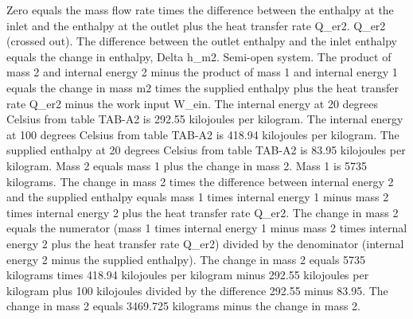 Zero equals the mass flow rate times the difference between the enthalpy at the inlet and the enthalpy at the outlet plus the heat transfer rate Q_er2.
Q_er2 (crossed out).
The difference between the outlet enthalpy and the inlet enthalpy equals the change in enthalpy, Delta h_m2.
Semi-open system.
The product of mass 2 and internal energy 2 minus the product of mass 1 and internal energy 1 equals the change in mass m2 times the supplied enthalpy plus the heat transfer rate Q_er2 minus the work input W_ein.
The internal energy at 20 degrees Celsius from table TAB-A2 is 292.55 kilojoules per kilogram.
The internal energy at 100 degrees Celsius from table TAB-A2 is 418.94 kilojoules per kilogram.
The supplied enthalpy at 20 degrees Celsius from table TAB-A2 is 83.95 kilojoules per kilogram.
Mass 2 equals mass 1 plus the change in mass 2.
Mass 1 is 5735 kilograms.
The change in mass 2 times the difference between internal energy 2 and the supplied enthalpy equals mass 1 times internal energy 1 minus mass 2 times internal energy 2 plus the heat transfer rate Q_er2.
The change in mass 2 equals the numerator (mass 1 times internal energy 1 minus mass 2 times internal energy 2 plus the heat transfer rate Q_er2) divided by the denominator (internal energy 2 minus the supplied enthalpy).
The change in mass 2 equals 5735 kilograms times 418.94 kilojoules per kilogram minus 292.55 kilojoules per kilogram plus 100 kilojoules divided by the difference 292.55 minus 83.95.
The change in mass 2 equals 3469.725 kilograms minus the change in mass 2.